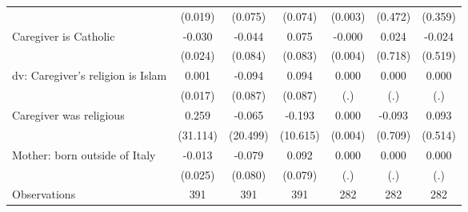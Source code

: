 {\begin{tabular}{l*{6}{c}}
                    &     (0.019)         &     (0.075)         &     (0.074)         &     (0.003)         &     (0.472)         &     (0.359)         \\
\addlinespace
Caregiver is Catholic&      -0.030         &      -0.044         &       0.075         &      -0.000         &       0.024         &      -0.024         \\
                    &     (0.024)         &     (0.084)         &     (0.083)         &     (0.004)         &     (0.718)         &     (0.519)         \\
\addlinespace
dv: Caregiver's religion is Islam&       0.001         &      -0.094         &       0.094         &       0.000         &       0.000         &       0.000         \\
                    &     (0.017)         &     (0.087)         &     (0.087)         &         (.)         &         (.)         &         (.)         \\
\addlinespace
Caregiver was religious&       0.259         &      -0.065         &      -0.193         &       0.000         &      -0.093         &       0.093         \\
                    &    (31.114)         &    (20.499)         &    (10.615)         &     (0.004)         &     (0.709)         &     (0.514)         \\
\addlinespace
Mother: born outside of Italy&      -0.013         &      -0.079         &       0.092         &       0.000         &       0.000         &       0.000         \\
                    &     (0.025)         &     (0.080)         &     (0.079)         &         (.)         &         (.)         &         (.)         \\
\midrule
Observations        &         391         &         391         &         391         &         282         &         282         &         282         \\
\bottomrule
\end{tabular}
}
